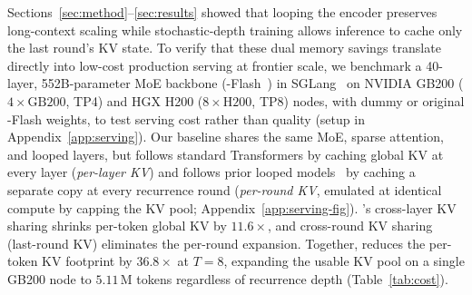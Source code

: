 Sections~\ref{sec:method}--\ref{sec:results} showed that looping the \ced encoder preserves long-context scaling while stochastic-depth training allows inference to cache only the last round's KV state.
To verify that these dual memory savings translate directly into low-cost production serving at frontier scale, we benchmark a 40-layer, 552B-parameter \ced MoE backbone (\vfour-Flash~\citep{deepseekv41}) in SGLang~\citep{sglang} on NVIDIA GB200 ($4\times\text{GB200}$, TP4) and HGX H200 ($8\times\text{H200}$, TP8) nodes, with dummy or original \vfour-Flash weights, to test serving cost rather than quality (setup in Appendix~\ref{app:serving}).
Our baseline shares the same MoE, sparse attention, and looped layers, but follows standard Transformers by caching global KV at every layer (\emph{per-layer KV}) and follows prior looped models~\citep{parcae} by caching a separate copy at every recurrence round (\emph{per-round KV}, emulated at identical compute by capping the KV pool; Appendix~\ref{app:serving-fig}).
\ced's cross-layer KV sharing shrinks per-token global KV by $11.6\times$, and cross-round KV sharing (last-round KV) eliminates the per-round expansion.
Together, \ourmethod reduces the per-token KV footprint by $\mathbf{36.8\times}$ at $T=8$, expanding the usable KV pool on a single GB200 node to $5.11$\,M tokens regardless of recurrence depth (Table~\ref{tab:cost}).


